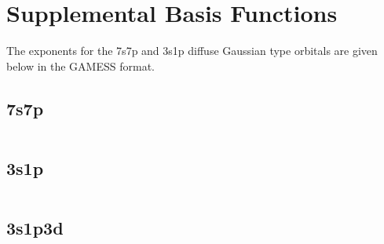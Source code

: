\section{Supplemental Basis Functions}
%
%
The exponents for the 7s7p and 3s1p diffuse Gaussian type orbitals are given below in the GAMESS format.
\subsection{7s7p}
\inputminted{md}{parts/basis7s7p.txt}
\subsection{3s1p}
\inputminted{md}{parts/basis3s1p.txt}
\subsection{3s1p3d}
\inputminted{md}{parts/basis3s1p3d.txt}
\newpage
